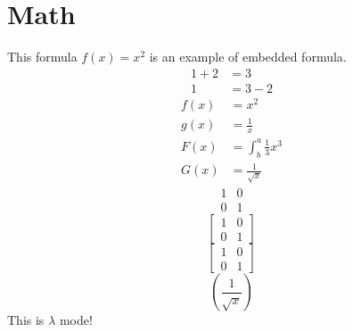 \documentclass{article}
\begin{document}
    \section{Math}
        This formula $f(x) = x^2$ is an example of embedded formula.
    \begin{align*}
 	1 + 2 &= 3\\
 	1 &= 3 - 2
    \end{align*}
    \begin{align*}
 	f(x) &= x^2\\
	g(x) &= \frac{1}{x}\\
	F(x) &= \int^a_b \frac{1}{3}x^3\\
	G(x) &= \frac{1}{\sqrt{x}}
    \end{align*}
    \begin{equation*}
	    \begin{matrix}
		1 & 0\\
		0 & 1
	    \end{matrix}
    \end{equation*}
    \begin{equation*}
	    \begin{bmatrix}
		1 & 0\\
		0 & 1
	    \end{bmatrix}
    \end{equation*}
    \begin{equation*}
	[
	\begin{matrix}
	    1 & 0\\
	    0 & 1
	\end{matrix}
	]
    \end{equation*}
    \begin{equation*}
	\left[
	\begin{matrix}
	    1 & 0\\
	    0 & 1
	\end{matrix}
	\right]
    \end{equation*}
    \begin{equation*}
	\left(\frac{1}{\sqrt{x}}\right)
    \end{equation*}
    This is $\lambda$ mode!
\end{document}
